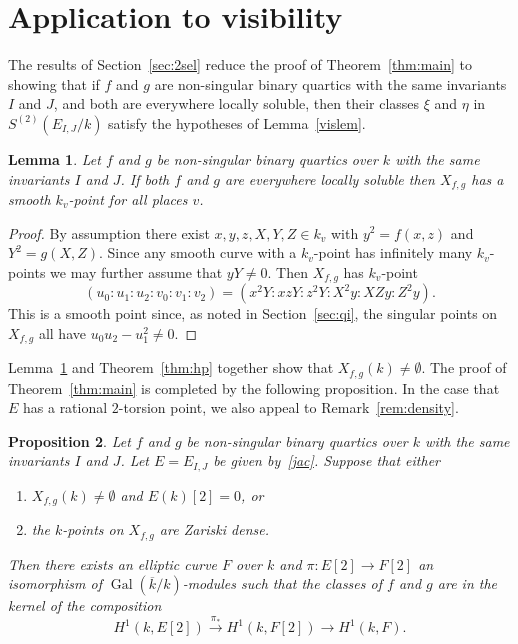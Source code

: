 \documentclass[12pt]{amsart}
\newcommand{\Gal}{{\operatorname{Gal}}}
\newcommand{\ra}{\longrightarrow}
\newcommand{\kbar}{{\overline k}}
\newtheorem{Proposition}{Proposition}[section]
\newtheorem{Lemma}[Proposition]{Lemma}
\theoremstyle{definition}
\begin{document}
\section{Application to visibility}
\label{sec:rel-vis}

The results of Section~\ref{sec:2sel} reduce the proof of
Theorem~\ref{thm:main} to showing that if $f$ and $g$ are non-singular
binary quartics with the same invariants $I$ and $J$, and both are
everywhere locally soluble, then their classes $\xi$ and $\eta$ in
$S^{(2)}(E_{I,J}/k)$ satisfy the hypotheses of Lemma~\ref{vislem}.

\begin{Lemma}
  \label{lem:loc-sol}
  Let $f$ and $g$ be non-singular binary quartics over $k$ with the
  same invariants $I$ and $J$. If both $f$ and $g$ are everywhere
  locally soluble then $X_{f,g}$ has a smooth $k_v$-point for all
  places $v$.
\end{Lemma}

\begin{proof}
  By assumption there exist $x,y,z,X,Y,Z \in k_v$ with $y^2 = f(x,z)$
  and $Y^2 = g(X,Z)$. Since any smooth curve with a $k_v$-point has
  infinitely many $k_v$-points we may further assume that $yY \not=0$.
  Then $X_{f,g}$ has $k_v$-point
  \[(u_0:u_1:u_2:v_0:v_1:v_2) = (x^2 Y:xz Y:z^2Y : X^2 y : X Z y : Z^2
    y).\] This is a smooth point since, as noted in Section~\ref{sec:qi},
  the singular points on $X_{f,g}$ all have $u_0u_2 - u_1^2 \not= 0$.
\end{proof}

Lemma~\ref{lem:loc-sol} and Theorem~\ref{thm:hp} together show that
$X_{f,g}(k) \not= \emptyset$.  The proof of Theorem~\ref{thm:main} is
completed by the following proposition.  In the case that $E$ has a rational
$2$-torsion point, we also appeal to Remark~\ref{rem:density}.

\begin{Proposition}
  \label{prop:use-pt}
  Let $f$ and $g$ be non-singular binary quartics over $k$ with the
  same invariants $I$ and $J$.  Let $E = E_{I,J}$ be given
  by~\eqref{jac}.  Suppose that either
  \begin{enumerate}
  \item $X_{f,g}(k) \not= \emptyset$ and $E(k)[2] = 0$, or 
  \item the $k$-points on $X_{f,g}$ are Zariski dense. %
  \end{enumerate}
  Then there exists an elliptic curve $F$ over $k$ and
  $\pi : E[2] \to F[2]$ an isomorphism of $\Gal(\kbar/k)$-modules such
  that the classes of $f$ and $g$ are in the kernel of the composition
  \begin{equation}
    \label{comp}
    H^1(k,E[2]) \stackrel{\pi_*}{\ra} H^1(k,F[2]) \ra H^1(k,F).
    \end{equation}
  \end{Proposition}
\end{document}
